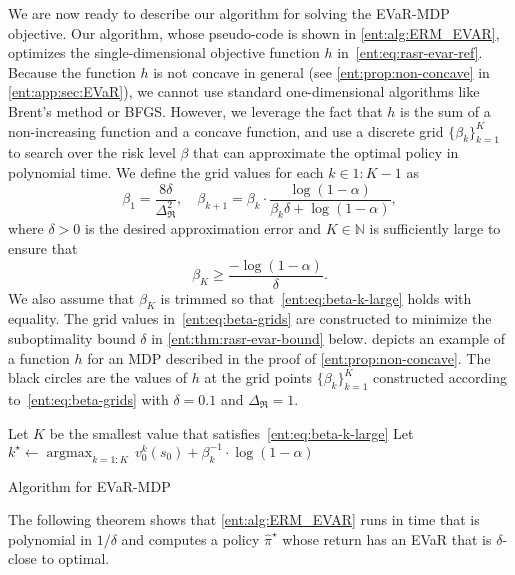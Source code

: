\documentclass[twoside]{article}
\newcommand{\opt}{^\star}
\DeclareMathOperator*{\argmax}{argmax}
\newcommand{\vspan}{\Delta_{\mathfrak{R}}}
\theoremstyle{plain}
\theoremstyle{definition}
\theoremstyle{remark}
\begin{document}
We are now ready to describe our algorithm for solving the EVaR-MDP objective. Our algorithm, whose pseudo-code is shown in \cref{ent:alg:ERM_EVAR}, optimizes the single-dimensional objective function $h$ in~\eqref{ent:eq:rasr-evar-ref}. Because the function $h$ is not concave in general (see \cref{ent:prop:non-concave} in \cref{ent:app:sec:EVaR}), we cannot use standard one-dimensional algorithms like Brent's method or BFGS. However, we leverage the fact that $h$ is the sum of a non-increasing function and a concave function, and use a discrete grid $\{\beta_k\}_{k=1}^K$ to search over the risk level $\beta$ that can approximate the optimal policy in polynomial time. We define the grid values for each $k\in 1{:}K{-}1$ as
\begin{equation}\label{ent:eq:beta-grids}
\beta_1 =  \frac{8 \delta}{ \vspan^2}, \quad \beta_{k+1} = \beta_k \cdot \frac{\log (1-\alpha)}{\beta_k\delta + \log (1-\alpha)},
\end{equation}
%
where $\delta > 0$ is the desired approximation error and $K \in \mathbb{N}$ is sufficiently large to ensure that
%
\begin{equation} \label{ent:eq:beta-k-large}
  \beta_K \ge \frac{-\log (1-\alpha)}{\delta}.
\end{equation}
%
We also assume that $\beta_K$ is trimmed so that~\eqref{ent:eq:beta-k-large} holds with equality. The grid values in~\eqref{ent:eq:beta-grids} are constructed to minimize the suboptimality bound $\delta$ in \cref{ent:thm:rasr-evar-bound} below.  depicts an example of a function $h$ for an MDP described in the proof of \cref{ent:prop:non-concave}. The black circles are the values of $h$ at the grid points $\{\beta_k\}_{k=1}^K$ constructed according to~\eqref{ent:eq:beta-grids} with $\delta = 0.1$ and $\vspan = 1$.

\begin{algorithm}[t]
    \KwOut{EVaR-MDP optimized policy $\hat{\pi}\opt$}
    Let $K$ be the smallest value that satisfies~\eqref{ent:eq:beta-k-large} \;
    Let $k\opt \gets \argmax_{k=1{:}K} \, v_0^k(s_0) + \beta_k^{-1} \cdot \log (1-\alpha)$\;
    \Return{Policy $\;\hat{\pi}\opt = \pi^{k\opt}$}
    \caption{Algorithm for EVaR-MDP}  \label{ent:alg:ERM_EVAR}
\end{algorithm}

The following theorem shows that \cref{ent:alg:ERM_EVAR} runs in time that is polynomial in $1/\delta$ and computes a policy $\hat{\pi}\opt$ whose return has an EVaR that is $\delta$-close to optimal.
\end{document}
